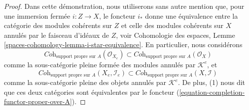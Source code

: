 \begin{proof}
Dans cette démonstration, nous utiliserons sans autre mention que, pour une immersion
fermée $i : Z \to X$, le foncteur $i_*$ donne une équivalence entre la
catégorie des modules cohérents sur $Z$ et celle des modules cohérents sur $X$ annulés
par le faisceau d'idéaux de $Z$, voir
Cohomologie des espaces, Lemme \ref{spaces-cohomology-lemma-i-star-equivalence}.
En particulier, nous considérons
$$
\textit{Coh}_{\text{support propre sur } A}(\mathcal{O}_{X_e})
\subset
\textit{Coh}_{\text{support propre sur } A}(\mathcal{O}_X)
$$
comme la sous-catégorie pleine formée des modules annulés par
$\mathcal{K}^e$, et
$$
\textit{Coh}_{\text{support propre sur } A}(X_e, \mathcal{I}_e)
\subset
\textit{Coh}_{\text{support propre sur } A}(X, \mathcal{I})
$$
comme la sous-catégorie pleine des objets annulés par $\mathcal{K}^e$.
De plus, (1) nous dit que ces deux catégories sont équivalentes par le
foncteur (\ref{equation-completion-functor-proper-over-A}).


\end{proof}
